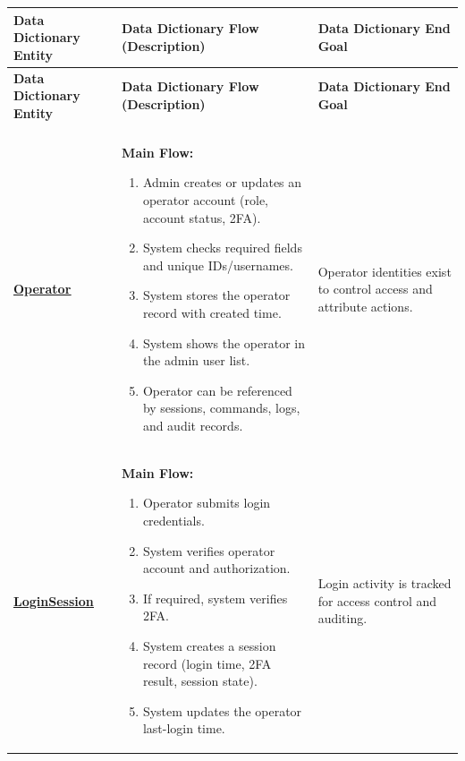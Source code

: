 \documentclass[11pt,a4paper]{article}
\let\orighyperref\hyperref
\renewcommand{\hyperref}[2][]{\orighyperref[#1]{\uline{#2}}}%
\begin{document}
\begin{longtable}{|>{\raggedright\arraybackslash}p{}|>{\raggedright\arraybackslash}p{}|>{\raggedright\arraybackslash}p{}|}
\hline
\rowcolor{tableheader}
\textbf{Data Dictionary Entity} & \textbf{Data Dictionary Flow (Description)} & \textbf{Data Dictionary End Goal} \\
\hline
\endfirsthead

\hline
\rowcolor{tableheader}
\textbf{Data Dictionary Entity} & \textbf{Data Dictionary Flow (Description)} & \textbf{Data Dictionary End Goal} \\
\hline
\endhead

\hline \multicolumn{3}{r}{{Continued on next page}} \\ \hline
\endfoot

\hline
\endlastfoot

\textbf{\hyperref[tab:data-dictionary-operator]{Operator}}\label{flow-Operator} &
\textbf{Main Flow:}\begin{enumerate}[leftmargin=*,nosep]
  \item Admin creates or updates an operator account (role, account status, 2FA).
  \item System checks required fields and unique IDs/usernames.
  \item System stores the operator record with created time.
  \item System shows the operator in the admin user list.
  \item Operator can be referenced by sessions, commands, logs, and audit records.
\end{enumerate} &
Operator identities exist to control access and attribute actions. \\
\hline

\textbf{\hyperref[tab:data-dictionary-loginsession]{LoginSession}}\label{flow-LoginSession} &
\textbf{Main Flow:}\begin{enumerate}[leftmargin=*,nosep]
  \item Operator submits login credentials.
  \item System verifies operator account and authorization.
  \item If required, system verifies 2FA.
  \item System creates a session record (login time, 2FA result, session state).
  \item System updates the operator last-login time.
\end{enumerate} &
Login activity is tracked for access control and auditing. \\
\hline


\end{longtable}
\end{document}
